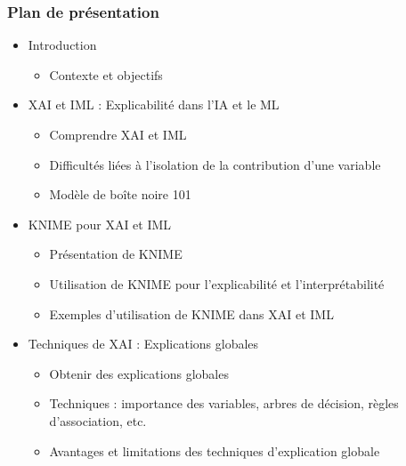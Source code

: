 \documentclass{beamer}
\begin{document}
\begin{frame}
	\frametitle{Plan de présentation}
	\begin{itemize}
		\item Introduction
		\begin{itemize}
			\item Contexte et objectifs
		\end{itemize}
		\item XAI et IML : Explicabilité dans l'IA et le ML
		\begin{itemize}
			\item Comprendre XAI et IML
			\item Difficultés liées à l'isolation de la contribution d'une variable
			\item Modèle de boîte noire 101
		\end{itemize}
		\item KNIME pour XAI et IML
		\begin{itemize}
			\item Présentation de KNIME
			\item Utilisation de KNIME pour l'explicabilité et l'interprétabilité
			\item Exemples d'utilisation de KNIME dans XAI et IML
		\end{itemize}
		\item Techniques de XAI : Explications globales
		\begin{itemize}
			\item Obtenir des explications globales
			\item Techniques : importance des variables, arbres de décision, règles d'association, etc.
			\item Avantages et limitations des techniques d'explication globale
		\end{itemize}
	\end{itemize}
\end{frame}

	
\end{document}
